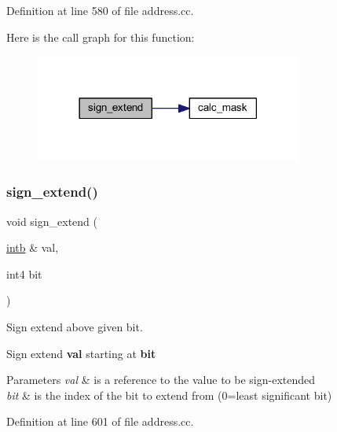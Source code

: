 Definition at line 580 of file address.\+cc.

Here is the call graph for this function\+:
\nopagebreak
\begin{figure}[H]
\begin{center}
\leavevmode
\includegraphics[width=249pt]{address_8hh_a6f16b447a8d8851178b1f0709c14bde6_cgraph}
\end{center}
\end{figure}
\mbox{\label{address_8hh_abe0bd95db53e851e047b8273ba4fb59f}} 
\subsubsection{\texorpdfstring{sign\_extend()}{sign\_extend()}\hspace{0.1cm}{\footnotesize\ttfamily [2/2]}}
{\footnotesize\ttfamily void sign\+\_\+extend (\begin{DoxyParamCaption}\item[{\mbox{\hyperlink{types_8h_aa925ba3e627c2df89d5b1cfe84fb8572}{intb}} \&}]{val,  }\item[{int4}]{bit }\end{DoxyParamCaption})}



Sign extend above given bit. 

Sign extend {\bfseries{val}} starting at {\bfseries{bit}} 
\begin{DoxyParams}{Parameters}
{\em val} & is a reference to the value to be sign-\/extended \\
\hline
{\em bit} & is the index of the bit to extend from (0=least significant bit) \\
\hline
\end{DoxyParams}


Definition at line 601 of file address.\+cc.

\mbox{\label{address_8hh_a78af4f83feb5be82e1cb2f6743792ba4}} 
